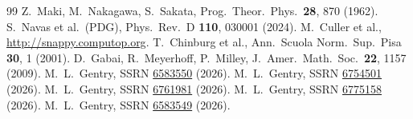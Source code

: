 \documentclass[11pt,a4paper]{article}
\theoremstyle{definition}
\begin{document}
\begin{thebibliography}{99}
Z.~Maki, M.~Nakagawa, S.~Sakata,
Prog.\ Theor.\ Phys.\ \textbf{28}, 870 (1962).
S.~Navas et al.\ (PDG), Phys.\ Rev.\ D \textbf{110}, 030001 (2024).
M.~Culler et al., \url{http://snappy.computop.org}.
T.~Chinburg et al.,
Ann.\ Scuola Norm.\ Sup.\ Pisa \textbf{30}, 1 (2001).
D.~Gabai, R.~Meyerhoff, P.~Milley,
J.\ Amer.\ Math.\ Soc.\ \textbf{22}, 1157 (2009).
M.~L.~Gentry, SSRN \href{https://doi.org/10.2139/ssrn.6583550}{6583550} (2026).
M.~L.~Gentry, SSRN \href{https://doi.org/10.2139/ssrn.6754501}{6754501} (2026).
M.~L.~Gentry, SSRN \href{https://doi.org/10.2139/ssrn.6761981}{6761981} (2026).
M.~L.~Gentry, SSRN \href{https://doi.org/10.2139/ssrn.6775158}{6775158} (2026).
M.~L.~Gentry, SSRN \href{https://doi.org/10.2139/ssrn.6583549}{6583549} (2026).
\end{thebibliography}
\end{document}
